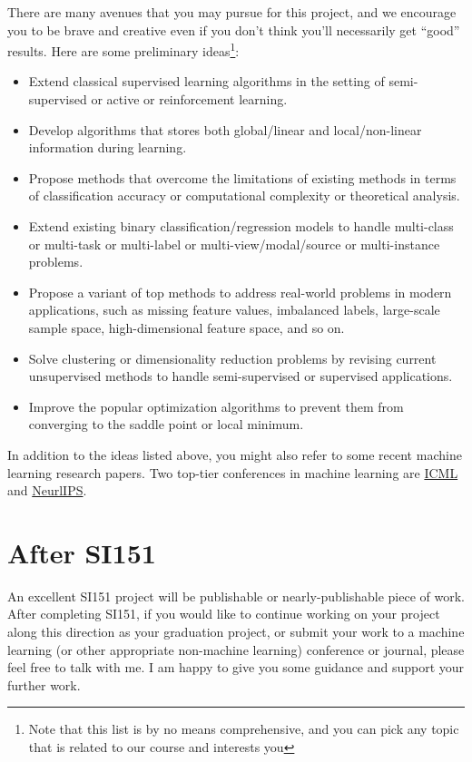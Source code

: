 \documentclass[10pt]{article}
\begin{document}
There are many avenues that you may pursue for this project, and we encourage you to be brave and creative
even if you don't think you'll necessarily get ``good'' results. Here are some preliminary ideas\footnote{\footnotesize Note that this list is by no means comprehensive,
	and you can pick any topic that is related to our course and interests you}:
\begin{itemize}
	\item Extend classical supervised learning algorithms in the setting of semi-supervised or active or reinforcement learning.
	\item Develop algorithms that stores both global/linear and local/non-linear information during learning.
	\item Propose methods that overcome the limitations of existing methods in terms of classification accuracy or computational complexity
	      or theoretical analysis.
	\item Extend existing binary classification/regression models to handle multi-class or multi-task or multi-label or multi-view/modal/source
	      or multi-instance problems.
	\item Propose a variant of top methods to address real-world problems in modern applications,
	      such as missing feature values, imbalanced labels, large-scale sample space, high-dimensional feature space, and so on.
	\item Solve clustering or dimensionality reduction problems by revising current unsupervised
	      methods to handle semi-supervised or supervised applications.
	\item Improve the popular optimization algorithms to prevent them from converging to the saddle point or local minimum.
\end{itemize}

In addition to the ideas listed above, you might also refer to some recent machine learning research papers. Two top-tier conferences in machine learning
are \href{https://icml.cc/Conferences/2019/Schedule?type=Poster}{ICML} and \href{https://papers.nips.cc/book/advances-in-neural-information-processing-systems-32-2019}{NeurlIPS}.


\section{After SI151}
An excellent SI151 project will be publishable or nearly-publishable piece of work.
After completing SI151, if you would like to continue working on your project along this direction as your graduation project,
or submit your work to a machine learning (or other appropriate non-machine learning) conference or journal,
please feel free to talk with me. I am happy to give you some guidance and support your further work.
\end{document}
